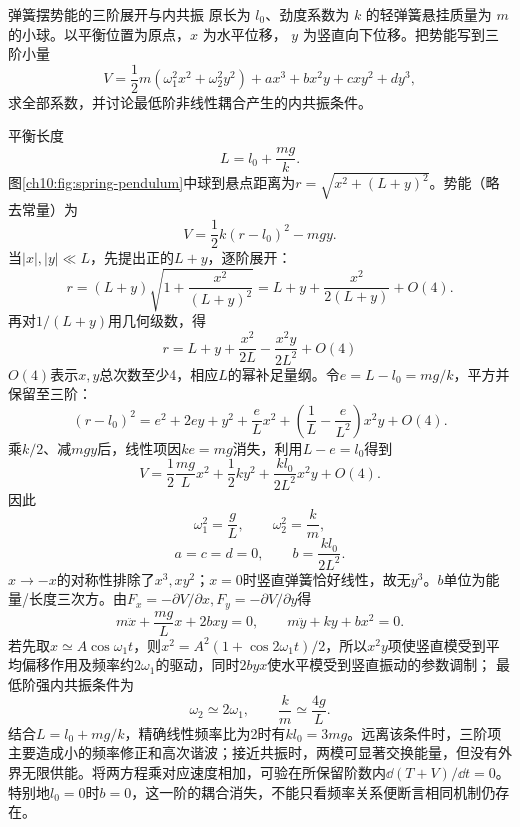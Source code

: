 \begin{origexamplebox}{弹簧摆势能的三阶展开与内共振}\label{ch10:ex:spring-pendulum}
原长为 $l_0$、劲度系数为 $k$ 的轻弹簧悬挂质量为 $m$ 的小球。以平衡位置为原点，$x$ 为水平位移，
$y$ 为竖直向下位移。把势能写到三阶小量
\[
 V=\frac12m(\omega_1^2x^2+\omega_2^2y^2)
 +ax^3+bx^2y+cxy^2+dy^3,
\]
求全部系数，并讨论最低阶非线性耦合产生的内共振条件。

\ThQSpringPendulum
\end{origexamplebox}
\begin{xesolution}
平衡长度
\[
 L=l_0+\frac{mg}{k}.
\]
图\ref{ch10:fig:spring-pendulum}中球到悬点距离为$r=\sqrt{x^2+(L+y)^2}$。势能（略去常量）为
\[
 V=\frac12k(r-l_0)^2-mgy.
\]
\chTenSpringPendulumFigure
当$|x|,|y|\ll L$，先提出正的$L+y$，逐阶展开：
\[
 r=(L+y)\sqrt{1+\frac{x^2}{(L+y)^2}}
 =L+y+\frac{x^2}{2(L+y)}+O(4).
\]
再对$1/(L+y)$用几何级数，得
\[
 r=L+y+\frac{x^2}{2L}-\frac{x^2y}{2L^2}+O(4)
\]
$O(4)$表示$x,y$总次数至少4，相应$L$的幂补足量纲。令$e=L-l_0=mg/k$，平方并保留至三阶：
\[
 (r-l_0)^2=e^2+2ey+y^2+\frac eLx^2
 +\left(\frac1L-\frac e{L^2}\right)x^2y+O(4).
\]
乘$k/2$、减$mgy$后，线性项因$ke=mg$消失，利用$L-e=l_0$得到
\[
 V=\frac12\frac{mg}{L}x^2+\frac12ky^2
 +\frac{kl_0}{2L^2}x^2y+O(4).
\]
因此
\[
 \boxed{\omega_1^2=\frac gL},\qquad
 \boxed{\omega_2^2=\frac km},
\]
\[
 \boxed{a=c=d=0},\qquad
 \boxed{b=\frac{kl_0}{2L^2}}.
\]
$x\to-x$的对称性排除了$x^3,xy^2$；$x=0$时竖直弹簧恰好线性，故无$y^3$。$b$单位为能量/长度三次方。由$F_x=-\partial V/\partial x,F_y=-\partial V/\partial y$得
\[
 m\ddot x+\frac{mg}{L}x+2bxy=0,\qquad
 m\ddot y+ky+bx^2=0.
\]
若先取$x\simeq A\cos\omega_1t$，则$x^2=A^2(1+\cos2\omega_1t)/2$，所以$x^2y$项使竖直模受到平均偏移作用及频率约$2\omega_1$的驱动，同时$2byx$使水平模受到竖直振动的参数调制；
最低阶强内共振条件为
\[
 \boxed{\omega_2\simeq2\omega_1},\qquad
 \frac{k}{m}\simeq\frac{4g}{L}.
\]
结合$L=l_0+mg/k$，精确线性频率比为2时有$kl_0=3mg$。远离该条件时，三阶项主要造成小的频率修正和高次谐波；接近共振时，两模可显著交换能量，但没有外界无限供能。将两方程乘对应速度相加，可验在所保留阶数内$\dd(T+V)/\dd t=0$。特别地$l_0=0$时$b=0$，这一阶的耦合消失，不能只看频率关系便断言相同机制仍存在。
\end{xesolution}

\endgroup

\hypersetup{bookmarksdepth=2}
